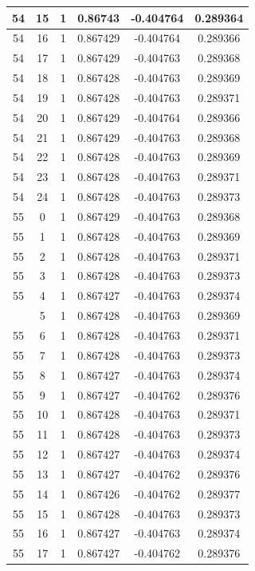 \documentclass[12pt,a4paper]{article}
\numberwithin{equation}{section}
\numberwithin{figure}{section}
\numberwithin{table}{section}
\begin{document}
\begin{longtable}{|c|c|c|c|c|c|}
54 & 15 & 1 & 0.86743 & -0.404764 & 0.289364 \\ \hline
54 & 16 & 1 & 0.867429 & -0.404764 & 0.289366 \\ \hline
54 & 17 & 1 & 0.867429 & -0.404763 & 0.289368 \\ \hline
54 & 18 & 1 & 0.867428 & -0.404763 & 0.289369 \\ \hline
54 & 19 & 1 & 0.867428 & -0.404763 & 0.289371 \\ \hline
54 & 20 & 1 & 0.867429 & -0.404764 & 0.289366 \\ \hline
54 & 21 & 1 & 0.867429 & -0.404763 & 0.289368 \\ \hline
54 & 22 & 1 & 0.867428 & -0.404763 & 0.289369 \\ \hline
54 & 23 & 1 & 0.867428 & -0.404763 & 0.289371 \\ \hline
54 & 24 & 1 & 0.867428 & -0.404763 & 0.289373 \\ \hline
55 & 0 & 1 & 0.867429 & -0.404763 & 0.289368 \\ \hline
55 & 1 & 1 & 0.867428 & -0.404763 & 0.289369 \\ \hline
55 & 2 & 1 & 0.867428 & -0.404763 & 0.289371 \\ \hline
55 & 3 & 1 & 0.867428 & -0.404763 & 0.289373 \\ \hline
55 & 4 & 1 & 0.867427 & -0.404763 & 0.289374 \\ \hline
\pagebreak
55 & 5 & 1 & 0.867428 & -0.404763 & 0.289369 \\ \hline
55 & 6 & 1 & 0.867428 & -0.404763 & 0.289371 \\ \hline
55 & 7 & 1 & 0.867428 & -0.404763 & 0.289373 \\ \hline
55 & 8 & 1 & 0.867427 & -0.404763 & 0.289374 \\ \hline
55 & 9 & 1 & 0.867427 & -0.404762 & 0.289376 \\ \hline
55 & 10 & 1 & 0.867428 & -0.404763 & 0.289371 \\ \hline
55 & 11 & 1 & 0.867428 & -0.404763 & 0.289373 \\ \hline
55 & 12 & 1 & 0.867427 & -0.404763 & 0.289374 \\ \hline
55 & 13 & 1 & 0.867427 & -0.404762 & 0.289376 \\ \hline
55 & 14 & 1 & 0.867426 & -0.404762 & 0.289377 \\ \hline
55 & 15 & 1 & 0.867428 & -0.404763 & 0.289373 \\ \hline
55 & 16 & 1 & 0.867427 & -0.404763 & 0.289374 \\ \hline
55 & 17 & 1 & 0.867427 & -0.404762 & 0.289376 \\ \hline

\end{longtable}
\end{document}
